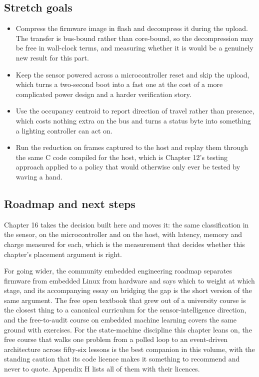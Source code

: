 \subsection*{Stretch goals}

\begin{itemize}
\item Compress the firmware image in flash and decompress it during the upload.
The transfer is bus-bound rather than core-bound, so the decompression may be
free in wall-clock terms, and measuring whether it is would be a genuinely new
result for this part.
\item Keep the sensor powered across a microcontroller reset and skip the
upload, which turns a two-second boot into a fast one at the cost of a more
complicated power design and a harder verification story.
\item Use the occupancy centroid to report direction of travel rather than
presence, which costs nothing extra on the bus and turns a status byte into
something a lighting controller can act on.
\item Run the reduction on frames captured to the host and replay them through
the same C code compiled for the host, which is Chapter 12's testing approach
applied to a policy that would otherwise only ever be tested by waving a hand.
\end{itemize}

\subsection*{Roadmap and next steps}

Chapter 16 takes the decision built here and moves it: the same classification in
the sensor, on the microcontroller and on the host, with latency, memory and
charge measured for each, which is the measurement that decides whether this
chapter's placement argument is right.

For going wider, the community embedded engineering roadmap separates firmware
from embedded Linux from hardware and says which to weight at which stage, and
its accompanying essay on bridging the gap is the short version of the same
argument. The free open textbook that grew out of a university course is the
closest thing to a canonical curriculum for the sensor-intelligence direction,
and the free-to-audit course on embedded machine learning covers the same ground
with exercises. For the state-machine discipline this chapter leans on, the free
course that walks one problem from a polled loop to an event-driven architecture
across fifty-six lessons is the best companion in this volume, with the standing
caution that its code licence makes it something to recommend and never to
quote. Appendix H lists all of them with their licences.

